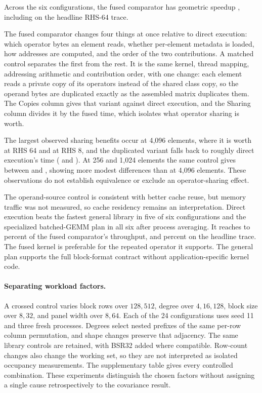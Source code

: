 

Across the six configurations, the fused comparator has geometric speedup
\DgFusedRatio{}, including \DgFusedLarge{} on the headline RHS-64 trace.

The fused comparator changes four things at once relative to direct
execution: which operator bytes an element reads, whether per-element metadata
is loaded, how addresses are computed, and the order of the two contributions.
A matched control separates the first from the rest. It is the same kernel,
thread mapping, addressing arithmetic and contribution order, with one change:
each element reads a private copy of its operators instead of the shared class
copy, so the operand bytes are duplicated exactly as the assembled matrix
duplicates them. The Copies column gives that variant against direct
execution, and the Sharing column divides it by the fused time, which isolates
what operator sharing is worth.

The largest observed sharing benefits occur at 4,096 elements, where it is
worth \DgSharingLarge{} at RHS 64 and \DgSharingNarrowLarge{} at RHS 8, and the
duplicated variant falls back to roughly direct execution's time
(\DgCopiesLarge{} and \DgCopiesNarrowLarge{}). At 256 and 1,024 elements the
same control gives between \DgSharingSmallMin{} and \DgSharingSmallMax{},
showing more modest differences than at 4,096 elements. These
observations do not establish equivalence or exclude an operator-sharing effect.

The operand-source control is consistent with better cache reuse, but memory
traffic was not measured, so cache residency remains an interpretation.
Direct execution beats the fastest general library in five of six
configurations and the specialized batched-GEMM plan in all six after process
averaging. It reaches \DgDirectShareMin{} to \DgDirectShareMax{} percent of the
fused comparator's throughput, and \DgDirectShareLarge{} percent on the
headline trace. The fused kernel is preferable for the repeated operator it
supports. The general plan supports the full block-format contract without
application-specific kernel code.

\paragraph{Separating workload factors.}
A crossed control varies block rows over \(128,512\), degree over
\(4,16,128\), block size over \(8,32\), and panel width over \(8,64\).
Each of the 24 configurations uses seed 11 and three fresh processes.
Degrees select nested prefixes of the same per-row column permutation,
and shape changes preserve that adjacency. The same library controls
are retained, with BSR32 added where compatible. Row-count changes also
change the working set, so they are not interpreted as isolated occupancy
measurements. The supplementary table gives every controlled combination.
These experiments distinguish the chosen factors without assigning a
single cause retrospectively to the covariance result.

